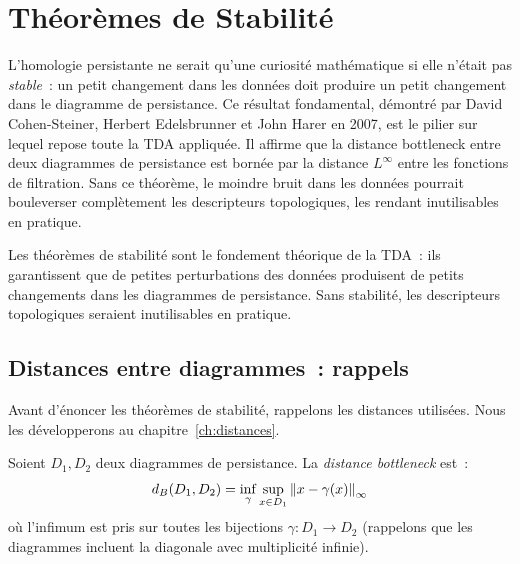 \chapter{Th\'eor\`emes de Stabilit\'e}
\label{ch:stabilite}

L'homologie persistante ne serait qu'une curiosit\'e math\'ematique si elle n'\'etait pas \emph{stable}~: un petit changement dans les donn\'ees doit produire un petit changement dans le diagramme de persistance. Ce r\'esultat fondamental, d\'emontr\'e par David Cohen-Steiner, Herbert Edelsbrunner et John Harer en 2007, est le pilier sur lequel repose toute la TDA appliqu\'ee. Il affirme que la distance bottleneck entre deux diagrammes de persistance est born\'ee par la distance $L^\infty$ entre les fonctions de filtration. Sans ce th\'eor\`eme, le moindre bruit dans les donn\'ees pourrait bouleverser compl\`etement les descripteurs topologiques, les rendant inutilisables en pratique.

\begin{intuition}
Les th\'eor\`emes de stabilit\'e sont le fondement th\'eorique de la
TDA~: ils garantissent que de petites perturbations des donn\'ees
produisent de petits changements dans les diagrammes de persistance.
Sans stabilit\'e, les descripteurs topologiques seraient inutilisables
en pratique.
\end{intuition}

\section{Distances entre diagrammes~: rappels}

Avant d'\'enoncer les th\'eor\`emes de stabilit\'e, rappelons les
distances utilis\'ees. Nous les d\'evelopperons au chapitre~\ref{ch:distances}.

\begin{definition}
Soient $D_1, D_2$ deux diagrammes de persistance. La \emph{distance
bottleneck} est~:
\[
  d_B(D_1, D_2) = \inf_{\gamma} \sup_{x \in D_1}
  \left\| x - \gamma(x) \right\|_\infty
\]
o\`u l'infimum est pris sur toutes les bijections
$\gamma : D_1 \to D_2$ (rappelons que les diagrammes incluent la
diagonale avec multiplicit\'e infinie).
\end{definition}

